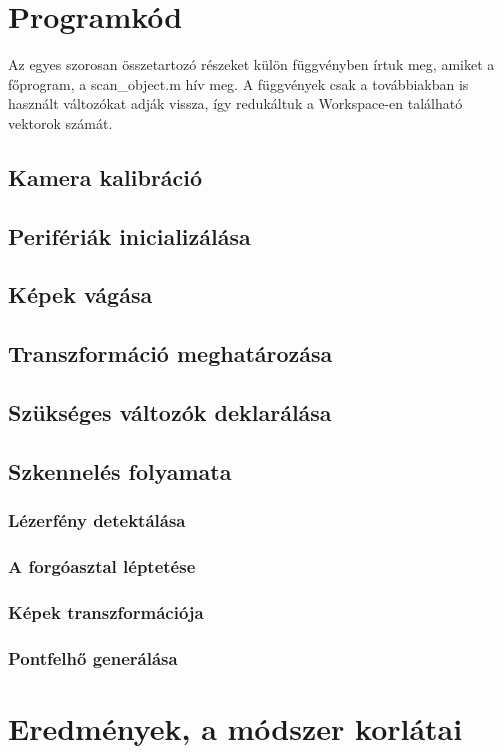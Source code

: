 \documentclass[12pt,a4paper]{article}
\begin{document}
\section{Programkód}
Az egyes szorosan összetartozó részeket külön függvényben írtuk meg, amiket a főprogram, a scan\_object.m hív meg. A függvények csak a továbbiakban is használt változókat adják vissza, így redukáltuk a Workspace-en található vektorok számát.
\subsection{Kamera kalibráció}
\subsection{Perifériák inicializálása}
\subsection{Képek vágása}
\subsection{Transzformáció meghatározása}
\subsection{Szükséges változók deklarálása}
\subsection{Szkennelés folyamata}
\subsubsection{Lézerfény detektálása}
\subsubsection{A forgóasztal léptetése}
\subsubsection{Képek transzformációja}
\subsubsection{Pontfelhő generálása}
\section{Eredmények, a módszer korlátai}
\end{document}
